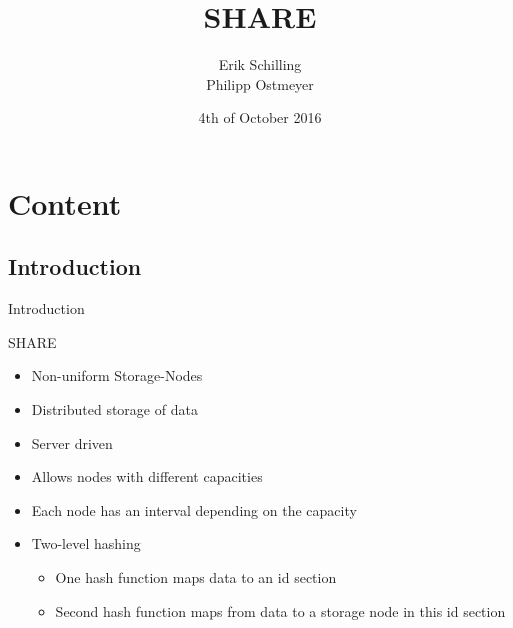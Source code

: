 \documentclass{beamer}
\title[SHARE]{SHARE}
\author{Erik Schilling\\Philipp	Ostmeyer}
\institute{Universität Paderborn}
\date{4th of October 2016}
\begin{document}
	\section{}
	\begin{frame}
		\titlepage
	\end{frame}

	\section{Content}
	\subsection{Introduction}
	\begin{frame}{Introduction}
		\begin{block}{SHARE}
			\begin{itemize}
				\item Non-uniform Storage-Nodes
				\item Distributed storage of data
				\item Server driven
			\end{itemize}
		\end{block}

		\begin{itemize}
			\item Allows nodes with different capacities
			\item Each node has an interval depending on the capacity
			\item Two-level hashing
			\begin{itemize}
				\item One hash function maps data to an id section
				\item Second hash function maps from data to a storage node in this id section
			\end{itemize}
		\end{itemize}
	\end{frame}
\end{document}
